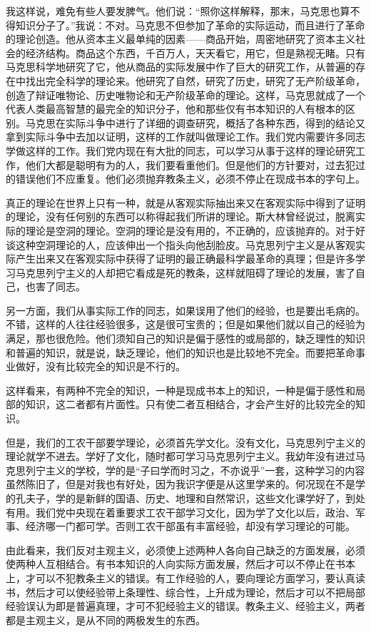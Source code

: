 我这样说，难免有些人要发脾气。他们说：“照你这样解释，那末，马克思也算不得知识分子了。”我说：不对。马克思不但参加了革命的实际运动，而且进行了革命的理论创造。他从资本主义最单纯的因素——商品开始，周密地研究了资本主义社会的经济结构。商品这个东西，千百万人，天天看它，用它，但是熟视无睹。只有马克思科学地研究了它，他从商品的实际发展中作了巨大的研究工作，从普遍的存在中找出完全科学的理论来。他研究了自然，研究了历史，研究了无产阶级革命，创造了辩证唯物论、历史唯物论和无产阶级革命的理论。这样，马克思就成了一个代表人类最高智慧的最完全的知识分子，他和那些仅有书本知识的人有根本的区别。马克思在实际斗争中进行了详细的调查研究，概括了各种东西，得到的结论又拿到实际斗争中去加以证明，这样的工作就叫做理论工作。我们党内需要许多同志学做这样的工作。我们党内现在有大批的同志，可以学习从事于这样的理论研究工作，他们大都是聪明有为的人，我们要看重他们。但是他们的方针要对，过去犯过的错误他们不应重复。他们必须抛弃教条主义，必须不停止在现成书本的字句上。

真正的理论在世界上只有一种，就是从客观实际抽出来又在客观实际中得到了证明的理论，没有任何别的东西可以称得起我们所讲的理论。斯大林曾经说过，脱离实际的理论是空洞的理论。空洞的理论是没有用的，不正确的，应该抛弃的。对于好谈这种空洞理论的人，应该伸出一个指头向他刮脸皮。马克思列宁主义是从客观实际产生出来又在客观实际中获得了证明的最正确最科学最革命的真理；但是许多学习马克思列宁主义的人却把它看成是死的教条，这样就阻碍了理论的发展，害了自己，也害了同志。

另一方面，我们从事实际工作的同志，如果误用了他们的经验，也是要出毛病的。不错，这样的人往往经验很多，这是很可宝贵的；但是如果他们就以自己的经验为满足，那也很危险。他们须知自己的知识是偏于感性的或局部的，缺乏理性的知识和普遍的知识，就是说，缺乏理论，他们的知识也是比较地不完全。而要把革命事业做好，没有比较完全的知识是不行的。

这样看来，有两种不完全的知识，一种是现成书本上的知识，一种是偏于感性和局部的知识，这二者都有片面性。只有使二者互相结合，才会产生好的比较完全的知识。

但是，我们的工农干部要学理论，必须首先学文化。没有文化，马克思列宁主义的理论就学不进去。学好了文化，随时都可学习马克思列宁主义。我幼年没有进过马克思列宁主义的学校，学的是“子曰学而时习之，不亦说乎”一套，这种学习的内容虽然陈旧了，但是对我也有好处，因为我识字便是从这里学来的。何况现在不是学的孔夫子，学的是新鲜的国语、历史、地理和自然常识，这些文化课学好了，到处有用。我们党中央现在着重要求工农干部学习文化，因为学了文化以后，政治、军事、经济哪一门都可学。否则工农干部虽有丰富经验，却没有学习理论的可能。

由此看来，我们反对主观主义，必须使上述两种人各向自己缺乏的方面发展，必须使两种人互相结合。有书本知识的人向实际方面发展，然后才可以不停止在书本上，才可以不犯教条主义的错误。有工作经验的人，要向理论方面学习，要认真读书，然后才可以使经验带上条理性、综合性，上升成为理论，然后才可以不把局部经验误认为即是普遍真理，才可不犯经验主义的错误。教条主义、经验主义，两者都是主观主义，是从不同的两极发生的东西。


